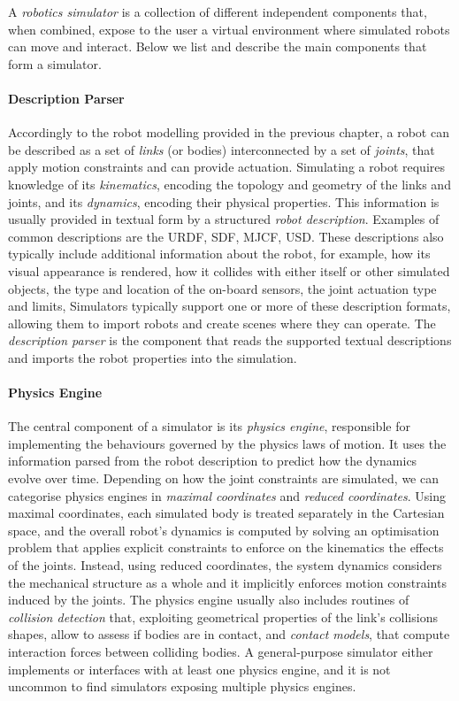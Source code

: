 A \emph{robotics simulator} is a collection of different independent components that, when combined, expose to the user a virtual environment where simulated robots can move and interact.
Below we list and describe the main components that form a simulator.

\paragraph{Description Parser}

Accordingly to the robot modelling provided in the previous chapter, a robot can be described as a set of \emph{links} (or bodies) interconnected by a set of \emph{joints}, that apply motion constraints and can provide actuation.
Simulating a robot requires knowledge of its \emph{kinematics}, encoding the topology and geometry of the links and joints, and its \emph{dynamics}, encoding their physical properties.
This information is usually provided in textual form by a structured \emph{robot description}.
Examples of common descriptions are the \ac{URDF}, \ac{SDF}, \ac{MJCF}, \ac{USD}.
These descriptions also typically include additional information about the robot, for example, how its visual appearance is rendered, how it collides with either itself or other simulated objects, the type and location of the on-board sensors, the joint actuation type and limits, \etc
Simulators typically support one or more of these description formats, allowing them to import robots and create scenes where they can operate.
The \emph{description parser} is the component that reads the supported textual descriptions and imports the robot properties into the simulation.

\paragraph{Physics Engine}

The central component of a simulator is its \emph{physics engine}, responsible for implementing the behaviours governed by the physics laws of motion.
It uses the information parsed from the robot description to predict how the dynamics evolve over time.
Depending on how the joint constraints are simulated, we can categorise physics engines in \emph{maximal coordinates} and \emph{reduced coordinates}.
Using maximal coordinates, each simulated body is treated separately in the Cartesian space, and the overall robot's dynamics is computed by solving an optimisation problem that applies explicit constraints to enforce on the kinematics the effects of the joints.
Instead, using reduced coordinates, the system dynamics considers the mechanical structure as a whole and it implicitly enforces motion constraints induced by the joints.
The physics engine usually also includes routines of \emph{collision detection} that, exploiting geometrical properties of the link's collisions shapes, allow to assess if bodies are in contact, and \emph{contact models}, that compute interaction forces between colliding bodies.
A general-purpose simulator either implements or interfaces with at least one physics engine, and it is not uncommon to find simulators exposing multiple physics engines.

